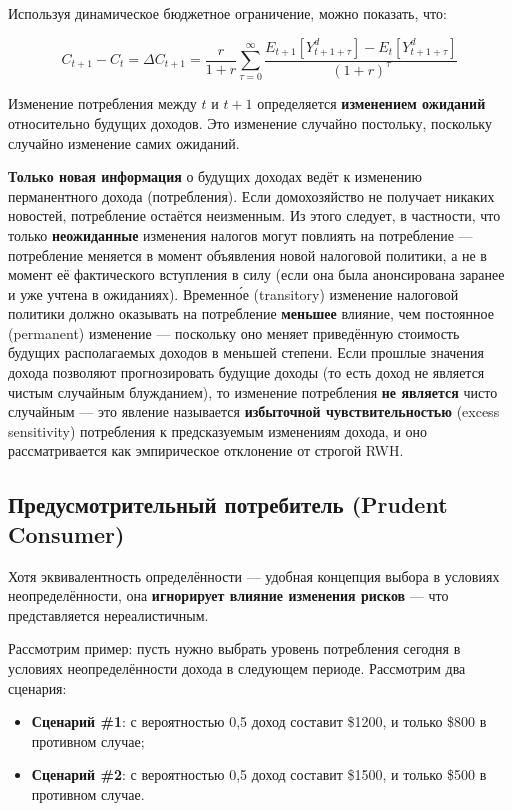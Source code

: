 \documentclass[10pt,a4paper]{article}
\begin{document}
Используя динамическое бюджетное ограничение, можно показать, что:
\begin{formulabox}
\begin{equation}
C_{t+1} - C_t = \Delta C_{t+1} = \frac{r}{1+r}\sum_{\tau=0}^{\infty}\frac{E_{t+1}[Y_{t+1+\tau}^{d}] - E_t[Y_{t+1+\tau}^{d}]}{(1+r)^\tau} \tag{7.10}
\end{equation}
\end{formulabox}

Изменение потребления между $t$ и $t+1$ определяется \textbf{изменением ожиданий} относительно будущих доходов. Это изменение случайно постольку, поскольку случайно изменение самих ожиданий.

\begin{intuition}
\textbf{Только новая информация} о будущих доходах ведёт к изменению перманентного дохода (потребления). Если домохозяйство не получает никаких новостей, потребление остаётся неизменным. Из этого следует, в частности, что только \textbf{неожиданные} изменения налогов могут повлиять на потребление — потребление меняется в момент объявления новой налоговой политики, а не в момент её фактического вступления в силу (если она была анонсирована заранее и уже учтена в ожиданиях). Временно́е (transitory) изменение налоговой политики должно оказывать на потребление \textbf{меньшее} влияние, чем постоянное (permanent) изменение — поскольку оно меняет приведённую стоимость будущих располагаемых доходов в меньшей степени. Если прошлые значения дохода позволяют прогнозировать будущие доходы (то есть доход не является чистым случайным блужданием), то изменение потребления \textbf{не является} чисто случайным — это явление называется \textbf{избыточной чувствительностью} (excess sensitivity) потребления к предсказуемым изменениям дохода, и оно рассматривается как эмпирическое отклонение от строгой RWH.
\end{intuition}

\subsection{Предусмотрительный потребитель (Prudent Consumer)}

Хотя эквивалентность определённости — удобная концепция выбора в условиях неопределённости, она \textbf{игнорирует влияние изменения рисков} — что представляется нереалистичным.

Рассмотрим пример: пусть нужно выбрать уровень потребления сегодня в условиях неопределённости дохода в следующем периоде. Рассмотрим два сценария:
\begin{itemize}[leftmargin=1.3em]
\item \textbf{Сценарий \#1}: с вероятностью 0{,}5 доход составит \$1200, и только \$800 в противном случае;
\item \textbf{Сценарий \#2}: с вероятностью 0{,}5 доход составит \$1500, и только \$500 в противном случае.
\end{itemize}
\end{document}
